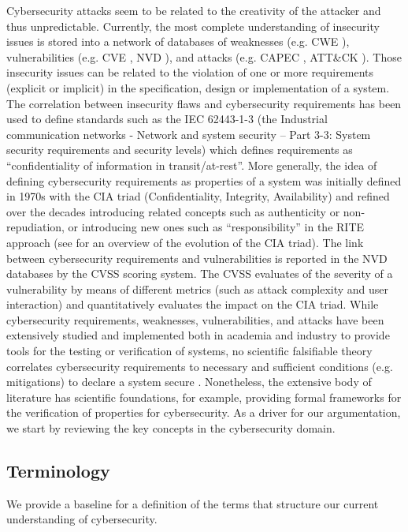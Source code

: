 \documentclass[runningheads]{llncs}
\begin{document}
Cybersecurity attacks seem to be related to the creativity of the attacker
and thus unpredictable. 
Currently, the most complete understanding of insecurity issues is stored into
a network of databases of weaknesses (e.g.
CWE \autocite{MITRE2020CWEresearch}), vulnerabilities (e.g. CVE \autocite{CVE},
NVD \autocite{NIST2020NVD}), and attacks (e.g. CAPEC \autocite{MITRE2020CAPEC},
ATT\&CK \autocite{MITRE2020ATTACK}).  Those insecurity issues can be related to
the violation of one or more requirements (explicit or implicit) in the
specification, design or implementation of a system. The correlation 
between insecurity flaws and cybersecurity requirements has been used to define
standards such as the IEC 62443-1-3 (the Industrial communication networks -
Network and system security -- Part 3-3: System security requirements and
security levels) which defines requirements as ``confidentiality of information
in transit/at-rest''. More generally, the idea of defining cybersecurity requirements
as properties of a system was initially defined in 1970s with the 
CIA triad (Confidentiality, Integrity, Availability) and refined 
over the decades introducing related concepts such as authenticity or
non-repudiation, or introducing new ones such as ``responsibility'' in the
RITE approach (see \autocite{Samonas2014cia} for an overview of the evolution of the CIA triad).
The link between cybersecurity requirements and vulnerabilities is reported 
in the NVD databases by the CVSS \autocite{Mell2007CVSS} scoring system.
The CVSS evaluates of the severity of a vulnerability
by means of different metrics (such as attack complexity and user interaction)
and quantitatively evaluates the impact on the CIA triad.
While cybersecurity requirements, weaknesses, vulnerabilities, and attacks
have been extensively studied and implemented both in academia and industry
to provide tools for the testing or verification of systems, 
no scientific falsifiable theory correlates
cybersecurity requirements to necessary and sufficient conditions (e.g. mitigations) 
to declare a system secure \autocite{Herley2016unfalsifiability}.
Nonetheless, the extensive body of literature has scientific foundations,
for example, providing formal frameworks for the verification of 
properties %
for cybersecurity.
As a driver for our argumentation, we start by reviewing the key concepts
in the cybersecurity domain.

\subsection{Terminology}
We provide a baseline for a definition of
the terms that structure our current understanding of cybersecurity.
\end{document}
